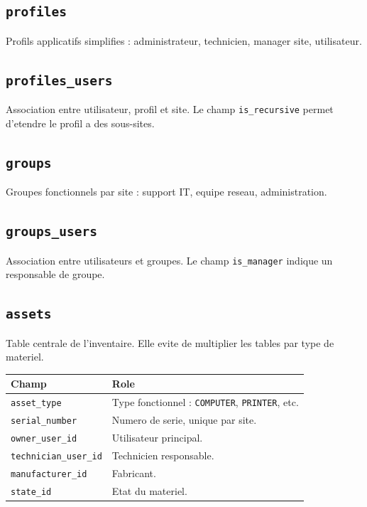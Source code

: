 \documentclass[11pt,a4paper]{article}
\begin{document}
\subsection{\texttt{profiles}}

Profils applicatifs simplifies : administrateur, technicien, manager site, utilisateur.

\subsection{\texttt{profiles\_users}}

Association entre utilisateur, profil et site. Le champ \texttt{is\_recursive} permet d'etendre le profil a des sous-sites.

\subsection{\texttt{groups}}

Groupes fonctionnels par site : support IT, equipe reseau, administration.

\subsection{\texttt{groups\_users}}

Association entre utilisateurs et groupes. Le champ \texttt{is\_manager} indique un responsable de groupe.

\subsection{\texttt{assets}}

Table centrale de l'inventaire. Elle evite de multiplier les tables par type de materiel.

\begin{longtable}{|p{4cm}|p{10cm}|}
\hline
\textbf{Champ} & \textbf{Role} \\
\hline
\texttt{asset\_type} & Type fonctionnel : \texttt{COMPUTER}, \texttt{PRINTER}, etc. \\
\hline
\texttt{serial\_number} & Numero de serie, unique par site. \\
\hline
\texttt{owner\_user\_id} & Utilisateur principal. \\
\hline
\texttt{technician\_user\_id} & Technicien responsable. \\
\hline
\texttt{manufacturer\_id} & Fabricant. \\
\hline
\texttt{state\_id} & Etat du materiel. \\
\hline
\end{longtable}
\end{document}
